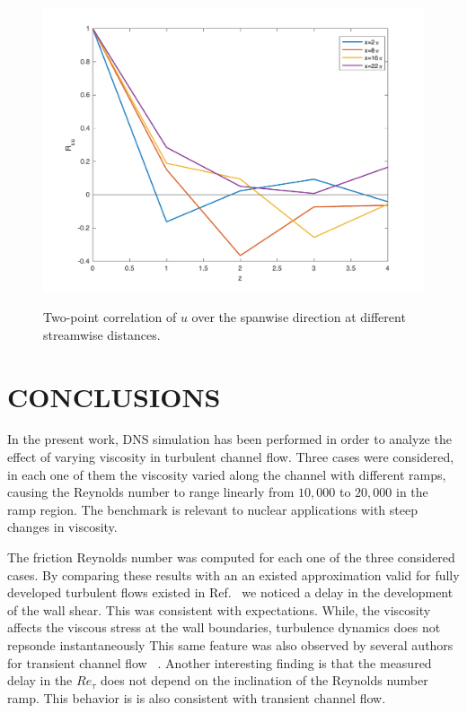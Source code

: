 \documentclass[twocolumn,10pt]{asme2e}
\begin{document}
\begin{figure}[t]
\centering
\scalebox{0.5}
{\includegraphics{spanwise_correlation.pdf}}
\caption{Two-point correlation of \(u\) over the spanwise direction at different streamwise distances.}
\label{fig:spanwise_correlation}
\end{figure}

\section*{CONCLUSIONS}

In the present work, DNS simulation has been performed in order to analyze the effect of varying viscosity in turbulent channel flow. Three cases were considered, in each one of them the viscosity varied along the channel with different ramps, causing the Reynolds number to range linearly from \(10,000\) to \(20,000\) in the ramp region. The benchmark is relevant to nuclear applications with steep changes in viscosity.

The friction Reynolds number was computed for each one of the three considered cases. By comparing these results with an an existed approximation valid for fully developed turbulent flows existed in Ref.~\cite{pope} we noticed a delay in the development of the wall shear. This was consistent with expectations. While, the viscosity affects the viscous stress at the wall boundaries, turbulence dynamics does not repsonde instantaneously This same feature was also observed by several authors for transient channel flow ~\cite{maruyama1976,he2000,greenblatt2004,he2015}. Another interesting finding is that the measured delay in the \(Re_{\tau}\) does not depend on the inclination of the Reynolds number ramp. This behavior is is also consistent with transient channel flow.
\end{document}
